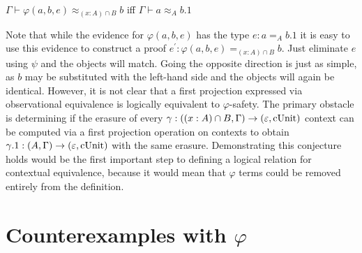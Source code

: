 \begin{conjecture}
    $\Gamma \vdash \varphi(a, b, e) \approx_{(x : A) \cap B} b$ iff $\Gamma \vdash a \approx_{A} b.1$
\end{conjecture}

Note that while the evidence for $\varphi(a, b, e)$ has the type $e : a =_A b.1$ it is easy to use this evidence to construct a proof $e^\prime : \varphi(a, b, e) =_{(x : A) \cap B} b$.
Just eliminate $e$ using $\psi$ and the objects will match.
Going the opposite direction is just as simple, as $b$ may be substituted with the left-hand side and the objects will again be identical.
However, it is not clear that a first projection expressed via observational equivalence is logically equivalent to $\varphi$-safety.
The primary obstacle is determining if the erasure of every $\gamma : ((x : A) \cap B, \Gamma) \to (\varepsilon, \textnormal{cUnit})$ context can be computed via a first projection operation on contexts to obtain $\gamma.1 : (A, \Gamma) \to (\varepsilon, \textnormal{cUnit})$ with the same erasure.
Demonstrating this conjecture holds would be the first important step to defining a logical relation for contextual equivalence, because it would mean that $\varphi$ terms could be removed entirely from the definition.

\section{Counterexamples with \texorpdfstring{$\varphi$}{Phi}}

